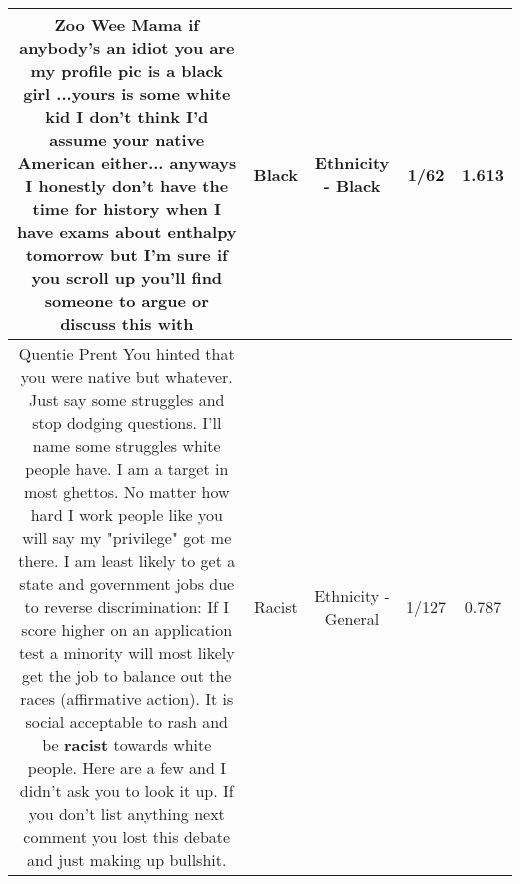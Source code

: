 \documentclass[11pt]{article}
\newlength\mylength
\begin{document}
\begin{center}
\begin{longtable}{|C{.65\mylength}|C{.30\mylength}|C{.12\mylength}|C{.12\mylength}|C{.12\mylength}|}
  \small Zoo Wee Mama if anybody's an idiot you are my profile pic is a \textbf{black} girl ...yours is some white kid I don't think I'd assume your native American either... anyways I honestly don't have the time for history when I have exams about enthalpy tomorrow  but I'm sure if you scroll up you'll find someone to argue or discuss this with\normalsize   & Black & Ethnicity - Black & 1/62 & 1.613 \\  \hline
  \small Quentie Prent You hinted that you were native but whatever. Just say some struggles and stop dodging questions. I'll name some struggles white people have. I am a target in most ghettos. No matter how hard I work people like you will say my "privilege" got me there. I am least likely to get a state and government jobs due to reverse discrimination: If I score higher on an application test a minority will most likely get the job to balance out the races (affirmative action). It is social acceptable to rash and be \textbf{racist} towards white people. Here are a few and I didn't ask you to look it up. If you don't list anything next comment you lost this debate and just making up bullshit.\normalsize   & Racist & Ethnicity - General & 1/127 & 0.787 \\  \hline

\end{longtable}
\end{center}
\end{document}
